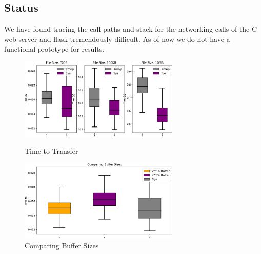 \subsection{\sysname Status}
We have found tracing the call paths and stack for the networking calls of the C web server and flask tremendously difficult.
As of now we do not have a functional prototype for results.

\begin{figure}[!htb]
    \begin{minipage}{0.5\textwidth}
        \centering
        \includegraphics[keepaspectratio=true,width=3in]{figures/evaluation/results.png}
        \caption{Time to Transfer}
        \label{fig:results}
    \end{minipage}%
    \begin{minipage}{0.5\textwidth}
        \centering
        \includegraphics[keepaspectratio=true,width=3in]{figures/evaluation/buf_compare.png}
        \caption{Comparing \sysname Buffer Sizes}
        \label{fig:buf}
    \end{minipage}%
\end{figure}